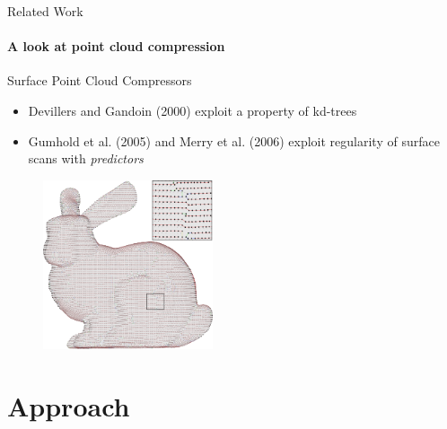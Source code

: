 \documentclass{beamer}
\begin{document}
\begin{frame}{Related Work}
  \framesubtitle{A look at point cloud compression}
  Surface Point Cloud Compressors
  \begin{itemize}
  \item Devillers and Gandoin (2000) exploit a property of kd-trees
  \item Gumhold et al. (2005) and Merry et al. (2006) exploit regularity of
    surface scans with \emph{predictors}
  \end{itemize}
  \begin{figure}
    \centering
    \includegraphics[width=50mm]{bunny}
  \end{figure}
\end{frame}



\section{Approach}
\end{document}
